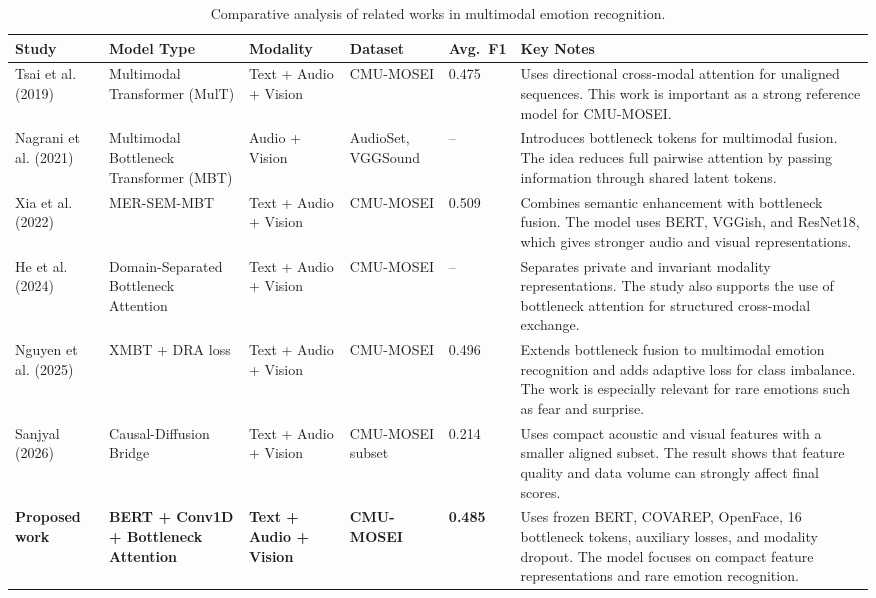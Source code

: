 \begin{table}[H]
\centering
\caption{Comparative analysis of related works in multimodal emotion recognition.}
\label{tab:lit_comparative}
\scriptsize
\begin{tabular}{p{2.7cm} p{2.8cm} p{1.6cm} p{1.7cm} p{1.2cm} p{4.4cm}}
\hline
\textbf{Study} & \textbf{Model Type} & \textbf{Modality} & \textbf{Dataset} & \textbf{Avg.~F1} & \textbf{Key Notes} \\
\hline

Tsai et al. (2019) \cite{tsai2019multimodal}
& Multimodal Transformer (MulT)
& Text + Audio + Vision
& CMU-MOSEI
& 0.475
& Uses directional cross-modal attention for unaligned sequences. This work is important as a strong reference model for CMU-MOSEI. \\[4pt]

Nagrani et al. (2021) \cite{nagrani2021attention}
& Multimodal Bottleneck Transformer (MBT)
& Audio + Vision
& AudioSet, VGGSound
& --
& Introduces bottleneck tokens for multimodal fusion. The idea reduces full pairwise attention by passing information through shared latent tokens. \\[4pt]

Xia et al. (2022) \cite{xia2022multimodal}
& MER-SEM-MBT
& Text + Audio + Vision
& CMU-MOSEI
& 0.509
& Combines semantic enhancement with bottleneck fusion. The model uses BERT, VGGish, and ResNet18, which gives stronger audio and visual representations. \\[4pt]

He et al. (2024) \cite{he2024domain}
& Domain-Separated Bottleneck Attention
& Text + Audio + Vision
& CMU-MOSEI
& --
& Separates private and invariant modality representations. The study also supports the use of bottleneck attention for structured cross-modal exchange. \\[4pt]

Nguyen et al. (2025) \cite{nguyen2025enhanced}
& XMBT + DRA loss
& Text + Audio + Vision
& CMU-MOSEI
& 0.496
& Extends bottleneck fusion to multimodal emotion recognition and adds adaptive loss for class imbalance. The work is especially relevant for rare emotions such as fear and surprise. \\[4pt]

Sanjyal (2026) \cite{sanjyal2026affectdiff}
& Causal-Diffusion Bridge
& Text + Audio + Vision
& CMU-MOSEI subset
& 0.214
& Uses compact acoustic and visual features with a smaller aligned subset. The result shows that feature quality and data volume can strongly affect final scores. \\[4pt]

\textbf{Proposed work}
& \textbf{BERT + Conv1D + Bottleneck Attention}
& \textbf{Text + Audio + Vision}
& \textbf{CMU-MOSEI}
& \textbf{0.485}
& Uses frozen BERT, COVAREP, OpenFace, 16 bottleneck tokens, auxiliary losses, and modality dropout. The model focuses on compact feature representations and rare emotion recognition. \\

\hline
\end{tabular}
\end{table}